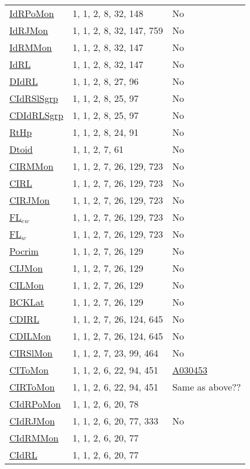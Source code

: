{\begin{tabular}{|l|l|l|}
\hyperlink{IdRPoMon}{IdRPoMon}& 1, 1, 2, 8, 32, 148 &No\\
\hyperlink{IdRJMon}{IdRJMon}& 1, 1, 2, 8, 32, 147, 759 &No \\
\hyperlink{IdRMMon}{IdRMMon}& 1, 1, 2, 8, 32, 147 &No\\
\hyperlink{IdRL}{IdRL}& 1, 1, 2, 8, 32, 147 &No\\
\hyperlink{DIdRL}{DIdRL}& 1, 1, 2, 8, 27, 96 &No\\
\hyperlink{CIdRSlSgrp}{CIdRSlSgrp}& 1, 1, 2, 8, 25, 97 &No\\
\hyperlink{CDIdRLSgrp}{CDIdRLSgrp}& 1, 1, 2, 8, 25, 97 &No\\
\hyperlink{RtHp}{RtHp}& 1, 1, 2, 8, 24, 91 &No\\
\hyperlink{Dtoid}{Dtoid}& 1, 1, 2, 7, 61 &No\\
\hyperlink{CIRMMon}{CIRMMon}& 1, 1, 2, 7, 26, 129, 723 &No\\
\hyperlink{CIRL}{CIRL}& 1, 1, 2, 7, 26, 129, 723 &No\\
\hyperlink{CIRJMon}{CIRJMon}& 1, 1, 2, 7, 26, 129, 723 &No\\
\hyperlink{FL$_{ew}$}{FL$_{ew}$}& 1, 1, 2, 7, 26, 129, 723 &No\\
\hyperlink{FL$_w$}{FL$_w$}& 1, 1, 2, 7, 26, 129, 723 &No\\
\hyperlink{Pocrim}{Pocrim}& 1, 1, 2, 7, 26, 129 &No\\
\hyperlink{CIJMon}{CIJMon}& 1, 1, 2, 7, 26, 129 &No\\
\hyperlink{CILMon}{CILMon}& 1, 1, 2, 7, 26, 129 &No\\
\hyperlink{BCKLat}{BCKLat}& 1, 1, 2, 7, 26, 129 &No\\
\hyperlink{CDIRL}{CDIRL}& 1, 1, 2, 7, 26, 124, 645 &No\\
\hyperlink{CDILMon}{CDILMon}& 1, 1, 2, 7, 26, 124, 645 &No\\
\hyperlink{CIRSlMon}{CIRSlMon}& 1, 1, 2, 7, 23, 99, 464 &No\\
\hyperlink{CIToMon}{CIToMon}& 1, 1, 2, 6, 22, 94, 451 &\href{http://oeis.org/A030453}{A030453}\\
\hyperlink{CIRToMon}{CIRToMon}& 1, 1, 2, 6, 22, 94, 451 &Same as above??\\
\hyperlink{CIdRPoMon}{CIdRPoMon}& 1, 1, 2, 6, 20, 78 &\\
\hyperlink{CIdRJMon}{CIdRJMon}& 1, 1, 2, 6, 20, 77, 333 &No\\
\hyperlink{CIdRMMon}{CIdRMMon}& 1, 1, 2, 6, 20, 77 &\\
\hyperlink{CIdRL}{CIdRL}& 1, 1, 2, 6, 20, 77 &\\

\end{tabular}}
